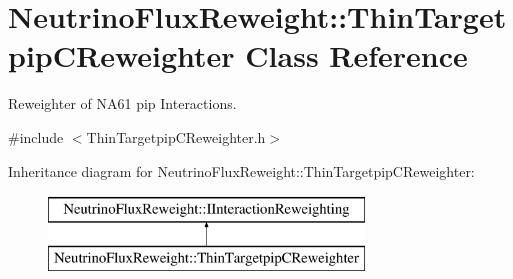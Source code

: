 \hypertarget{class_neutrino_flux_reweight_1_1_thin_targetpip_c_reweighter}{\section{Neutrino\-Flux\-Reweight\-:\-:Thin\-Targetpip\-C\-Reweighter Class Reference}
\label{class_neutrino_flux_reweight_1_1_thin_targetpip_c_reweighter}
}


Reweighter of N\-A61 pip Interactions.  




{\ttfamily \#include $<$Thin\-Targetpip\-C\-Reweighter.\-h$>$}

Inheritance diagram for Neutrino\-Flux\-Reweight\-:\-:Thin\-Targetpip\-C\-Reweighter\-:\begin{figure}[H]
\begin{center}
\leavevmode
\includegraphics[height=2.000000cm]{class_neutrino_flux_reweight_1_1_thin_targetpip_c_reweighter}
\end{center}
\end{figure}
